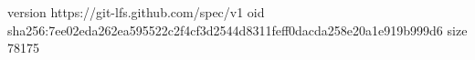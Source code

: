 version https://git-lfs.github.com/spec/v1
oid sha256:7ee02eda262ea595522c2f4cf3d2544d8311feff0dacda258e20a1e919b999d6
size 78175
